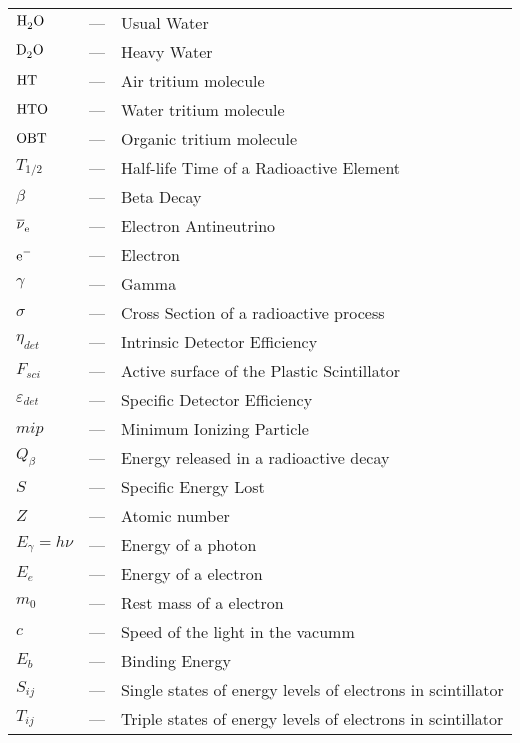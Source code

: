 \begin{longtable}{p{25mm} c p{120mm} }
$\ce{H_{2}O}$ & --- & Usual Water\\
$\ce{D_{2}O}$ & --- & Heavy Water\\
$\ce{HT}$ & --- & Air tritium molecule\\
$\ce{HTO}$ & --- & Water tritium molecule\\
$\ce{OBT}$ & --- & Organic tritium molecule\\
$T_{1/2}$ & --- & Half-life Time of a Radioactive Element\\
$\beta$ & --- & Beta Decay\\
$\ce{\overline{\nu}_e}$ & --- & Electron Antineutrino\\
$\ce{e^-}$ & --- & Electron\\
$\gamma$ & --- & Gamma\\
$\sigma$ & --- & Cross Section of a radioactive process\\
$\eta_{det}$ & --- & Intrinsic Detector Efficiency\\
$F_{sci}$ & --- & Active surface of the Plastic Scintillator\\
$\varepsilon_{det}$ & --- & Specific Detector Efficiency\\
$mip$ & --- & Minimum Ionizing Particle\\
$Q_\beta$ & --- & Energy released in a radioactive decay\\
$S$ & --- & Specific Energy Lost\\
$Z$ & --- & Atomic number\\
$E_\gamma = h\nu$ & --- & Energy of a photon\\
$E_e$ & --- & Energy of a electron\\
$m_0$ & --- & Rest mass of a electron\\
$c$ & --- & Speed of the light in the vacumm\\
$E_b$ & --- & Binding Energy\\
$S_{ij}$ & --- & Single states of energy levels of electrons in scintillator\\
$T_{ij}$ & --- & Triple states of energy levels of electrons in scintillator\\


\end{longtable}
